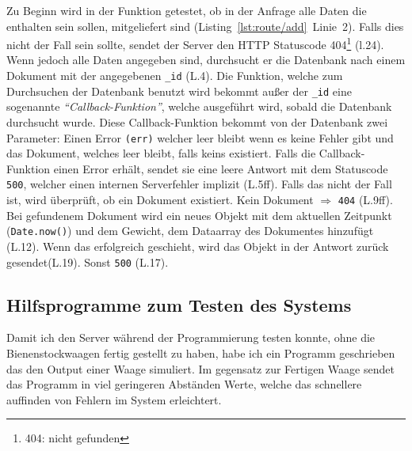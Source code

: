 \documentclass[a4paper, ngerman, 11pt]{scrartcl}
\newcommand{\js}[1]{\texttt{#1}}
\begin{document}
Zu Beginn wird in der Funktion getestet, ob in der Anfrage alle Daten die enthalten sein sollen, mitgeliefert sind (Listing~\autoref{lst:route/add}~Linie~2).
Falls dies nicht der Fall sein sollte, sendet der Server den HTTP Statuscode 404\footnote{404: nicht gefunden} (l.24).
Wenn jedoch alle Daten angegeben sind, durchsucht er die Datenbank nach einem Dokument mit der angegebenen \js{_id} (L.4).
Die Funktion, welche zum Durchsuchen der Datenbank benutzt wird bekommt außer der \js{_id} eine sogenannte \emph{\enquote{Callback-Funktion}}, welche ausgeführt wird, sobald die Datenbank durchsucht wurde.
Diese Callback-Funktion bekommt von der Datenbank zwei Parameter: Einen Error \js{(err)} welcher leer bleibt wenn es keine Fehler gibt und das Dokument, welches leer bleibt, falls keins existiert. 
Falls die Callback-Funktion einen Error erhält, sendet sie eine leere Antwort mit dem Statuscode \texttt{500}, welcher einen internen Serverfehler implizit (L.5ff). Falls das nicht der Fall ist, wird überprüft, ob ein Dokument existiert. Kein Dokument $\Rightarrow$ \texttt{404} (L.9ff). Bei gefundenem Dokument wird ein neues Objekt mit dem aktuellen Zeitpunkt (\js{Date.now()}) und dem Gewicht, dem Dataarray des Dokumentes hinzufügt (L.12). Wenn das erfolgreich geschieht, wird das Objekt in der Antwort zurück gesendet(L.19). Sonst \texttt{500} (L.17).

\subsection[Tests]{Hilfsprogramme zum Testen des Systems} %

Damit ich den Server während der Programmierung testen konnte, ohne die Bienenstockwaagen fertig gestellt zu haben, habe ich ein Programm geschrieben das den Output einer Waage simuliert. Im gegensatz zur Fertigen Waage sendet das Programm in viel geringeren Abständen Werte, welche das schnellere auffinden von Fehlern im System erleichtert.
\clearpage{}
\printbibheading{}
\printbibliography[type=book,heading=subbibliography,title={Buch Quellen}]
\printbibliography[type=misc,heading=subbibliography,title={Internet Quellen}]
\end{document}
